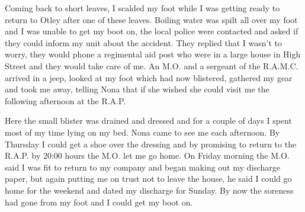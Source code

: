 Coming back to short leaves, I scalded my foot while I was getting
ready to return to Otley after one of these leaves. Boiling water was
spilt all over my foot and I was unable to get my boot on, the local
police were contacted and asked if they could inform my unit about the
accident. They replied that I wasn't to worry, they would phone a
regimental aid post who were in a large house in High Street and they
would take care of me. An M.O. and a sergeant of the R.A.M.C. arrived in a
jeep, looked at my foot which had now blistered, gathered my gear and
took me away, telling Nona that if she wished she could visit me the
following afternoon at the R.A.P.

Here the small blister was drained and dressed and for a couple of
days I spent most of my time lying on my bed. Nona came to see me each
afternoon. By Thursday I could get a shoe over the dressing and by
promising to return to the R.A.P. by 20:00 hours the M.O. let me go
home. On Friday morning the M.O. said I was fit to return to my company
and began making out my discharge paper, but again putting me on trust
not to leave the house, he said I could go home for the weekend and
dated my discharge for Sunday. By now the soreness had gone from my
foot and I could get my boot on.

